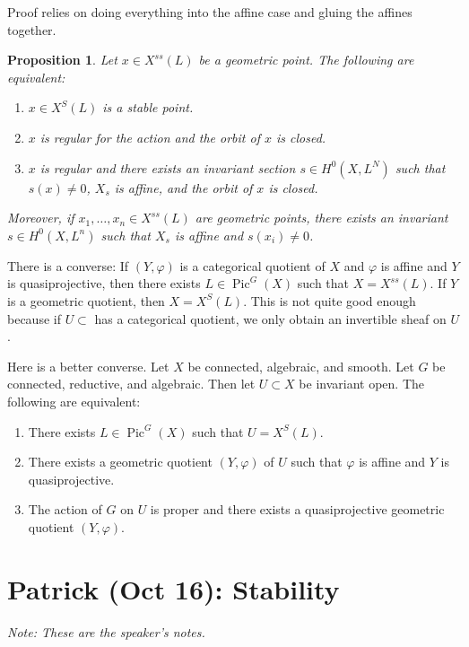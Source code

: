\documentclass[leqno, openany]{memoir}
\newtheorem{prop}[thm]{Proposition}
\theoremstyle{definition}
\theoremstyle{remark}
\theoremstyle{plain}
\theoremstyle{definition}
\theoremstyle{remark}
\DeclareMathOperator{\Pic}{Pic}
\begin{document}
Proof relies on doing everything into the affine case and gluing the affines
together. 

\begin{prop} Let $x \in X^{ss}(L)$ be a geometric point. The following are
    equivalent: \begin{enumerate} \item $x \in X^S(L)$ is a stable point.
        \item $x$ is regular for the action and the orbit of $x$ is closed.
        \item $x$ is regular and there exists an invariant section $s \in
            H^0(X,L^N)$ such that $s(x) \neq 0$, $X_s$ is affine, and the orbit
            of $x$ is closed.  \end{enumerate} Moreover, if $x_1, \ldots, x_n
        \in X^{ss}(L)$ are geometric points, there exists an invariant $s \in
    H^0(X, L^n)$ such that $X_s$ is affine and $s(x_i) \neq 0$.  \end{prop}

There is a converse: If $(Y, \varphi)$ is a categorical quotient of $X$ and
$\varphi$ is affine and $Y$ is quasiprojective, then there exists $L \in
\Pic^G(X)$ such that $X = X^{ss}(L)$. If $Y$ is a geometric quotient, then $X =
X^S(L)$. This is not quite good enough because if $U \subset $ has a
categorical quotient, we only obtain an invertible sheaf on $U$.

Here is a better converse. Let $X$ be connected, algebraic, and smooth. Let $G$
be connected, reductive, and algebraic. Then let $U \subset X$ be invariant
open. The following are equivalent: \begin{enumerate} \item There exists $L \in
    \Pic^G(X)$ such that $U = X^S(L)$.  \item There exists a geometric quotient
    $(Y, \varphi)$ of $U$ such that $\varphi$ is affine and $Y$ is
    quasiprojective.  \item The action of $G$ on $U$ is proper and there exists
    a quasiprojective geometric quotient $(Y, \varphi)$.  \end{enumerate}

\chapter{Patrick (Oct 16): Stability}%

\textit{Note: These are the speaker's notes.} 
\end{document}
